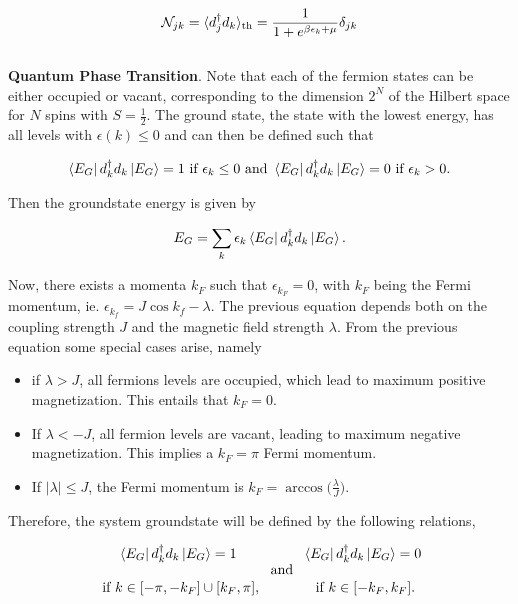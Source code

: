 \documentclass{homework}
\begin{document}
\begin{equation}
    \mathcal{N}_{jk} = \langle d_j^\dagger d_k \rangle_{\textnormal{th}} =  \frac{1}{1+e^{\beta \epsilon_k + \mu}} \delta_{jk} 
\end{equation} \\

\textbf{Quantum Phase Transition}. Note that each of the fermion states can be either occupied or vacant, corresponding to the dimension $2^N$ of the Hilbert space for $N$ spins with $S = \frac{1}{2}$. The ground state, the state with the lowest energy, has all levels with $\epsilon(k) \leq 0$ and can then be defined such that

\begin{equation}
    \bra{E_G} d_k^\dagger d_k \ket{E_G} = 1 \textnormal{ if } \epsilon_k \leq 0 \textnormal{ and } \bra{E_G} d_k^\dagger d_k \ket{E_G} = 0 \textnormal{ if } \epsilon_k > 0.
\end{equation}

Then the groundstate energy is given by 

\begin{equation}
    E_G = \sum_{k} \epsilon_k \bra{E_G} d_k^\dagger d_k \ket{E_G}.
\end{equation}

Now, there exists a momenta $k_F$ such that $\epsilon_{k_F} = 0$, with $k_F$ being the Fermi momentum, ie. $\epsilon_{k_f} = J \cos k_f - \lambda$. The previous equation depends both on the coupling strength $J$ and the magnetic field strength $\lambda$. From the previous equation some special cases arise, namely 

\begin{itemize}
    \item if $\lambda > J$, all fermions levels are occupied, which lead to maximum positive magnetization. This entails that $k_F = 0$.
    \item If $\lambda < -J$, all fermion levels are vacant, leading to maximum negative magnetization. This implies a $k_F = \pi$ Fermi momentum.
    \item If $|\lambda| \leq J$, the Fermi momentum is $k_F = \arccos \bigg(\frac{\lambda}{J}\bigg)$.
\end{itemize}

Therefore, the system groundstate will be defined by the following relations, 

\begin{equation}
    \begin{array}{c}
         \bra{E_G} d_k^\dagger d_k \ket{E_G} = 1  \\
         \\
         \textnormal{ if } k \in [-\pi, -k_F] \cup [k_F, \pi],
    \end{array} \textnormal{ and }  \begin{array}{c}
         \bra{E_G} d_k^\dagger d_k \ket{E_G} = 0  \\
         \\
         \textnormal{ if } k \in [-k_F, k_F].
    \end{array}
\end{equation}
\end{document}
